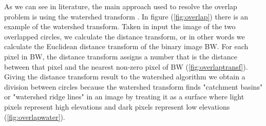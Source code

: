 \bigskip

As we can see in literature, the main approach used to resolve the overlap problem is using the watershed transform \cite{water}. In figure (\ref{fig:overlap}) there is an example of the watershed transform. Taken in input the image of the two overlapped circles, we calculate the distance transform, or in other words we calculate the Euclidean distance transform of the binary image BW. For each pixel in BW, the distance transform assigns a number that is the distance between that pixel and the nearest non-zero pixel of BW (\ref{fig:overlaptransf}). Giving the distance transform result to the watershed algorithm we obtain a division between circles because the watershed transform finds "catchment basins" or "watershed ridge lines" in an image by treating it as a surface where light pixels represent high elevations and dark pixels represent low elevations (\ref{fig:overlapwater}).
